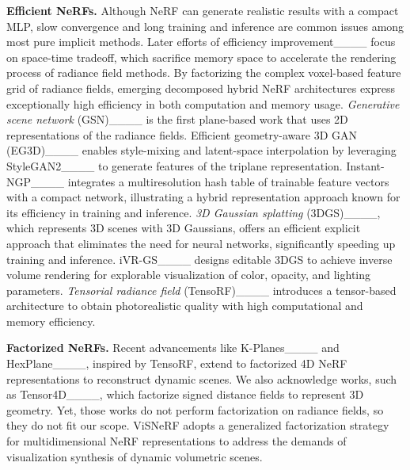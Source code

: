 {\bf Efficient NeRFs.}
Although NeRF can generate realistic results with a compact MLP, slow convergence and long training and inference are common issues among most pure implicit methods.
Later efforts of efficiency improvement____ focus on space-time tradeoff, which sacrifice memory space to accelerate the rendering process of radiance field methods. 
By factorizing the complex voxel-based feature grid of radiance fields, emerging decomposed hybrid NeRF architectures express exceptionally high efficiency in both computation and memory usage. 
{\em Generative scene network} (GSN)____ is the first plane-based work that uses 2D representations of the radiance fields.
Efficient geometry-aware 3D GAN (EG3D)____ enables style-mixing and latent-space interpolation by leveraging StyleGAN2____ to generate features of the triplane representation.
Instant-NGP____ integrates a multiresolution hash table of trainable feature vectors with a compact network, illustrating a hybrid representation approach known for its efficiency in training and inference.
{\em 3D Gaussian splatting} (3DGS)____, which represents 3D scenes with 3D Gaussians, offers an efficient explicit approach that eliminates the need for neural networks, significantly speeding up training and inference.
iVR-GS____ designs editable 3DGS to achieve inverse volume rendering for explorable visualization of color, opacity, and lighting parameters. 
{\em Tensorial radiance field} (TensoRF)____ introduces a tensor-based architecture to obtain photorealistic quality with high computational and memory efficiency.

{\bf Factorized NeRFs.}
Recent advancements like K-Planes____ and HexPlane____, inspired by TensoRF, extend to factorized 4D NeRF representations to reconstruct dynamic scenes.
We also acknowledge works, such as Tensor4D____, which factorize signed distance fields to represent 3D geometry. 
Yet, those works do not perform factorization on radiance fields, so they do not fit our scope.
ViSNeRF adopts a generalized factorization strategy for multidimensional NeRF representations to address the demands of visualization synthesis of dynamic volumetric scenes.

